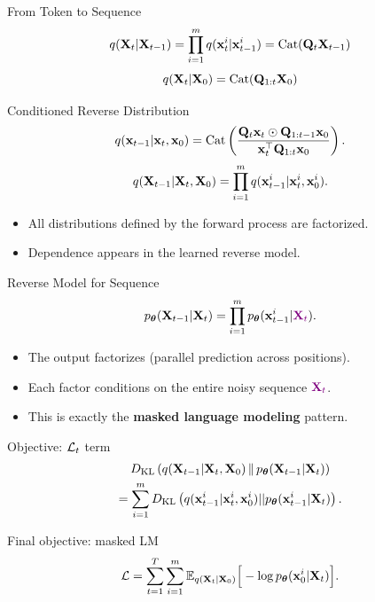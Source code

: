 \documentclass{beamer}
\begin{document}
\begin{frame}{From Token to Sequence}
    \[
        q(\mathbf{X}_t |\mathbf{X}_{t-1}) =
		\prod_{i=1}^m q(\mathbf{x}_t^i |\mathbf{x}_{t-1}^i) = \operatorname{Cat}(\mathbf{Q}_t \mathbf{X}_{t-1})
    \]
    \eqpause
    \[
        q(\mathbf{X}_t |\mathbf{X}_0) = \operatorname{Cat}(\mathbf{Q}_{1:t} \mathbf{X}_0)
    \]
    \vspace{-0.3cm}
    \eqpause
    \begin{block}{Conditioned Reverse Distribution}
        \[
            q(\mathbf{x}_{t-1} | \mathbf{x}_t, \mathbf{x}_0)
			= \operatorname{Cat}\left(\frac{\mathbf{Q}_t \mathbf{x}_t \odot \mathbf{Q}_{1:t-1} \mathbf{x}_0}{\mathbf{x}_t^{\top}\mathbf{Q}_{1:t}\mathbf{x}_0}\right).
        \]
        \vspace{-0.3cm}
        \[
            q(\mathbf{X}_{t-1} | \mathbf{X}_t, \mathbf{X}_0) =
            \prod_{i=1}^m q(\mathbf{x}_{t-1}^i |\mathbf{x}_t^i, \mathbf{x}_0^i).
        \]
        \vspace{-0.3cm}
    \end{block}
    \eqpause
    \begin{itemize}
        \item All distributions defined by the forward process are factorized.
        \item Dependence appears in the learned reverse model.
    \end{itemize}
\end{frame}
\begin{frame}{Reverse Model for Sequence}
    \[
        p_{\boldsymbol{\theta}}(\mathbf{X}_{t-1}|\mathbf{X}_t) =
		\prod_{i=1}^m p_{\boldsymbol{\theta}}(\mathbf{x}_{t-1}^i | {\color{violet}\mathbf{X}_t}).
    \]
    \vspace{-0.3cm}
    \begin{itemize}
        \item The output factorizes (parallel prediction across positions).
        \item Each factor conditions on the entire noisy sequence ${\color{violet}\mathbf{X}_t}$.
        \item This is exactly the \textbf{masked language modeling} pattern.
    \end{itemize}
    \eqpause
    \begin{block}{Objective: $\mathcal{L}_t$ term}
        \vspace{-0.7cm}
        \begin{multline*}
			D_\mathrm{KL}\left(q(\mathbf{X}_{t-1}| \mathbf{X}_t, \mathbf{X}_0)\,\|\,p_{\boldsymbol{\theta}}(\mathbf{X}_{t-1}| \mathbf{X}_t)\right) \\
			= \sum_{i=1}^m D_\mathrm{KL}\left(q(\mathbf{x}_{t-1}^i|\mathbf{x}_t^i, \mathbf{x}_0^i) || p_{\boldsymbol{\theta}}(\mathbf{x}_{t-1}^i|\mathbf{X}_t)\right).
        \end{multline*}
        \vspace{-0.5cm}
    \end{block}
    \eqpause
    \begin{block}{Final objective: masked LM}
        \vspace{-0.3cm}
        \[
            \mathcal{L} =
            \sum_{t=1}^T \sum_{i=1}^m
            \mathbb{E}_{q(\mathbf{X}_t|\mathbf{X}_0)}
            \Big[-\log p_{\boldsymbol{\theta}}(\mathbf{x}_0^i |\mathbf{X}_t)\Big].
        \]
    \end{block}
\end{frame}
\end{document}
